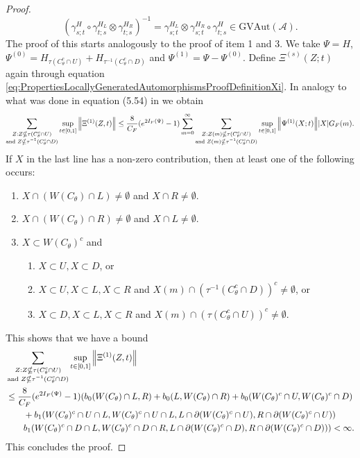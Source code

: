 \documentclass[12pt,a4paper,twoside]{article}
\renewcommand{\AA}{\mathcal A}
\theoremstyle{definition}
\numberwithin{equation}{section}
\begin{document}
\begin{proof}
	\begin{equation}
		(\gamma^H_{s;t}\circ\gamma^{H_L}_{t;s}\otimes\gamma^{H_R}_{t;s})^{-1}=\gamma^{H_L}_{s;t}\otimes\gamma^{H_R}_{s;t}\circ\gamma^H_{t;s}\in\textrm{GVAut}(\AA).
	\end{equation}
	The proof of this starts analogously to the proof of item 1 and 3. We take $\Psi=H$, $\Psi^{(0)}=H_{\tau(C_\theta^c\cap U)}+H_{\tau^{-1}(C_\theta^c\cap D)}$ and $\Psi^{(1)}=\Psi-\Psi^{(0)}$. Define $\Xi^{(s)}(Z;t)$ again through equation \eqref{eq:PropertiesLocallyGeneratedAutomorphismsProofDefinitionXi}. In analogy to what was done in equation (5.54) in \cite{ogata2021h3gmathbb} we obtain
	\begin{equation}
		\sum_{\substack{Z:Z\nsubseteq \tau(C_\theta^c\cap U)\\\text{and }Z\nsubseteq \tau^{-1}(C_\theta^c\cap D)}}\sup_{t\in[0,1]}\norm{\Xi^{(1)}(Z,t)}\leq \frac{8}{C_F}(e^{2I_F(\Psi)}-1)\sum_{m=0}^\infty\sum_{\substack{Z:Z(m)\nsubseteq \tau(C_\theta^c\cap U)\\\text{and }Z(m)\nsubseteq \tau^{-1}(C_\theta^c\cap D)}} \sup_{t\in[0,1]}\norm{\Psi^{(1)}(X;t)}\abs{X}G_F(m).
	\end{equation}
	If $X$ in the last line has a non-zero contribution, then at least one of the following occurs:
	\begin{enumerate}
		\item $X\cap (W(C_\theta)\cap L)\neq\emptyset$ and $X\cap R\neq\emptyset$.
		\item $X\cap (W(C_\theta)\cap R)\neq\emptyset$ and $X\cap L\neq\emptyset$.
		\item $X\subset W(C_\theta)^c$ and
		\begin{enumerate}
			\item $X\subset U,X\subset D$, or
			\item $X\subset U,X\subset L,X\subset R$ and $X(m)\cap (\tau^{-1}(C_\theta^c\cap D))^c\neq \emptyset$, or
			\item $X\subset D,X\subset L,X\subset R$ and $X(m)\cap (\tau(C_\theta^c\cap U))^c\neq \emptyset$.
		\end{enumerate}
	\end{enumerate}
	This shows that we have a bound
	\begin{align}
		&\sum_{\substack{Z:Z\nsubseteq \tau(C_\theta^c\cap U)\\\text{and }Z\nsubseteq \tau^{-1}(C_\theta^c\cap D)}}\sup_{t\in[0,1]}\norm{\Xi^{(1)}(Z,t)}\\
		\nonumber
		&\leq \frac{8}{C_F}(e^{2I_F(\Psi)}-1)(b_0(W(C_\theta)\cap L,R)+b_0(L,W(C_\theta)\cap R)+b_0(W(C_\theta)^c\cap U,W(C_\theta)^c\cap D)\\
		\nonumber
		&\qquad+b_1(W(C_\theta)^c\cap U\cap L,W(C_\theta)^c\cap U\cap L,L\cap\partial(W(C_\theta)^c\cap U),R\cap\partial(W(C_\theta)^c\cap U))\\
		&\qquad b_1(W(C_\theta)^c\cap D\cap L,W(C_\theta)^c\cap D\cap R,L\cap\partial(W(C_\theta)^c\cap D),R\cap\partial(W(C_\theta)^c\cap D)))<\infty.
	\end{align}
	This concludes the proof.
\end{proof}
\end{document}
